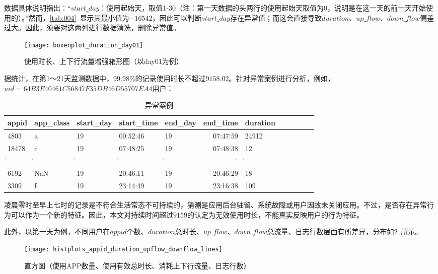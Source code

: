 \documentclass[withoutpreface,bwprint]{cumcmthesis}
\begin{document}
数据具体说明指出：“$start\_day$：使用起始天，取值1-30（注：第一天数据的头两行的使用起始天取值为0，说明是在这一天的前一天开始使用的）。”然而，\cref{tab:004}~显示其最小值为$-16542$，因此可以判断$start\_day$存在异常值；而这会直接导致$duration$、$up\_flow$、$down\_flow$偏差过大。因此，须要对这两列进行数据清洗，删除异常值。

\begin{figure}[!htbp]
    \centering
    \texttt{[image: boxenplot\_duration\_day01]}
    \caption{使用时长、上下行流量增强箱形图（以day01为例）}
    \label{fig:004}
\end{figure}

据统计，在第1～21天监测数据中，$99.98\%$的记录使用时长不超过$9158.02$。针对异常案例进行分析，例如，$uid=64B3E40461C56847F35DB46D55707EA4$用户：

\begin{table}[!htbp]
    \caption{异常案例}\label{tab:005} \centering
    \begin{tabular}{lllllrlrlrrr}
        \toprule[1.5pt]
        appid & app\_class & start\_day & start\_time & end\_day & end\_time & duration \\
        \midrule[1pt]
        4803  & a          & 19         & 00:52:46    & 19       & 07:47:59  & 24912    \\
        18478 & c          & 19         & 07:48:25    & 19       & 07:48:38  & 12       \\
        \.    & \.         & \.         & \.          & \.       & \.        & \.       \\
        6192  & NaN        & 19         & 20:46:11    & 19       & 20:46:29  & 18       \\
        3309  & f          & 19         & 23:14:49    & 19       & 23:16:38  & 109      \\
        \bottomrule[1.5pt]
    \end{tabular}
\end{table}

凌晨零时至早上七时的记录是不符合生活常态不可持续的，猜测是应用后台驻留、系统故障或用户因故未关闭应用。不过，是否存在异常行为可以作为一个新的特征。因此，本文对持续时间超过$9159$的认定为无效使用时长，不能真实反映用户的行为特征。

此外，以第一天为例，不同用户在$appid$个数、$duration$总时长、$up\_flow$、$down\_flow$总流量、日志行数层面有所差异，分布如\cref{fig:005}~所示。

\begin{figure}[!htbp]
    \centering
    \texttt{[image: histplots\_appid\_duration\_upflow\_downflow\_lines]}
    \caption{直方图（使用APP数量、使用有效总时长、消耗上下行流量、日志行数）}
    \label{fig:005}
\end{figure}
\end{document}
